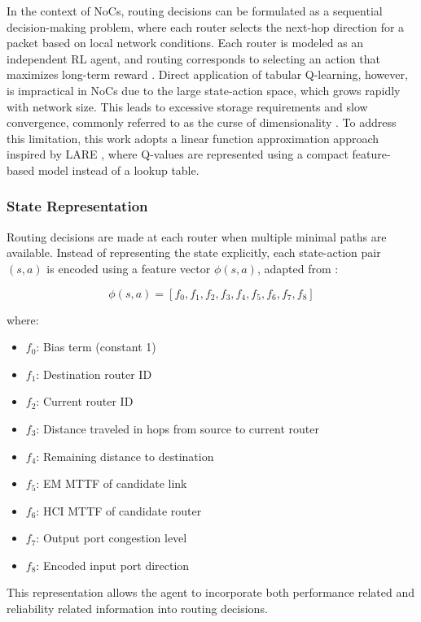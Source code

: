 In the context of NoCs, routing decisions can be formulated as a sequential decision-making problem, where each router selects the next-hop direction for a packet based on local network conditions. Each router is modeled as an independent RL agent, and routing corresponds to selecting an action that maximizes long-term reward \cite{LARE2023}. Direct application of tabular Q-learning, however, is impractical in NoCs due to the large state-action space, which grows rapidly with network size. This leads to excessive storage requirements and slow convergence, commonly referred to as the curse of dimensionality \cite{Ebrahimi2012}. To address this limitation, this work adopts a linear function approximation approach inspired by LARE \cite{LARE2023}, where Q-values are represented using a compact feature-based model instead of a lookup table.

\subsubsection{State Representation}

Routing decisions are made at each router when multiple minimal paths are available. Instead of representing the state explicitly, each state-action pair $(s,a)$ is encoded using a feature vector $\phi(s,a)$, adapted from \cite{LARE2023}:

\begin{equation}
\phi(s,a) = [f_0, f_1, f_2, f_3, f_4, f_5, f_6, f_7, f_8]
\end{equation}

where:
\begin{itemize}
    \item $f_0$: Bias term (constant 1)
    \item $f_1$: Destination router ID
    \item $f_2$: Current router ID
    \item $f_3$: Distance traveled in hops from source to current router
    \item $f_4$: Remaining distance to destination
    \item $f_5$: EM MTTF of candidate link
    \item $f_6$: HCI MTTF of candidate router
    \item $f_7$: Output port congestion level
    \item $f_8$: Encoded input port direction
\end{itemize}

This representation allows the agent to incorporate both performance related and reliability related information into routing decisions.

